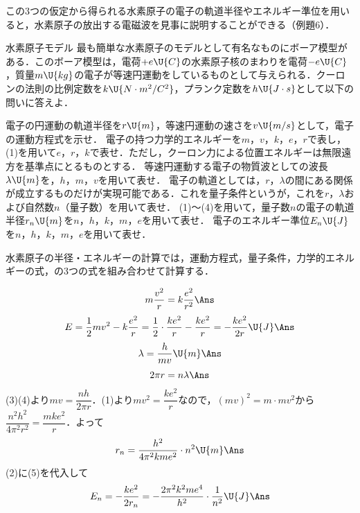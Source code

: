 この3つの仮定から得られる水素原子の電子の軌道半径やエネルギー準位を用いると，水素原子の放出する電磁波を見事に説明することができる（例題6）．

\bsNeed{70mm}
\begin{reidaiunit}
\begin{reidai}{水素原子モデル}
\hspace{1zw}最も簡単な水素原子のモデルとして有名なものにボーア模型がある．このボーア模型は，電荷$+e\U{C}$の水素原子核のまわりを電荷$-e\U{C}$，質量$m\U{kg}$の電子が等速円運動をしているものとして与えられる．クーロンの法則の比例定数を$k\U{N\cdot m^2/C^2}$，プランク定数を$h\U{J\cdot s}$として以下の問いに答えよ．
\begin{komon}
 電子の円運動の軌道半径を$r\U{m}$，等速円運動の速さを$v\U{m/s}$として，電子の運動方程式を示せ．
 電子の持つ力学的エネルギーを$m$，$v$，$k$，$e$，$r$で表し，(1)を用いて$e$，$r$，$k$で表せ．ただし，クーロン力による位置エネルギーは無限遠方を基準点にとるものとする．
 等速円運動する電子の物質波としての波長$\lambda\U{m}$を，$h$，$m$，$v$を用いて表せ．
 電子の軌道としては，$r$，$\lambda$の間にある関係が成立するものだけが実現可能である．これを量子条件というが，これを$r$，$\lambda$および自然数$n$（量子数）を用いて表せ．
 (1)〜(4)を用いて，量子数$n$の電子の軌道半径$r_n\U{m}$を$n$，$h$，$k$，$m$，$e$を用いて表せ．
 電子のエネルギー準位$E_n\U{J}$を$n$，$h$，$k$，$m$，$e$を用いて表せ．
\end{komon}
\end{reidai}

\begin{sisinE}
水素原子の半径・エネルギーの計算では，運動方程式，量子条件，力学的エネルギーの式，の3つの式を組み合わせて計算する．
\end{sisinE}


\begin{kaitou}
\begin{komon}
 \[m\frac{v^2}{r}=k\frac{e^2}{r^2}\Ans\]
 \[E=\frac{1}{2}mv^2-k\frac{e^2}{r}=\frac{1}{2}\cdot\frac{ke^2}{r}-\frac{ke^2}{r}=-\frac{ke^2}{2r}\U{J}\Ans\]
 \[\lambda=\frac{h}{mv}\U{m}\Ans\]
 \[2\pi r=n\lambda\Ans\]
 (3)(4)より$mv=\dfrac{nh}{2\pi r}$．(1)より$mv^2=\dfrac{ke^2}{r}$なので，$(mv)^2=m\cdot mv^2$から$\dfrac{n^2h^2}{4\pi^2r^2}=\dfrac{mke^2}{r}$．よって
       \[r_n=\frac{h^2}{4\pi^2kme^2}\cdot n^2\U{m}\Ans\]
 (2)に(5)を代入して
       \[E_n=-\frac{ke^2}{2r_n}=-\frac{2\pi^2k^2me^4}{h^2}\cdot\frac{1}{n^2}\U{J}\Ans\]
\end{komon}
\end{kaitou}
\end{reidaiunit}

